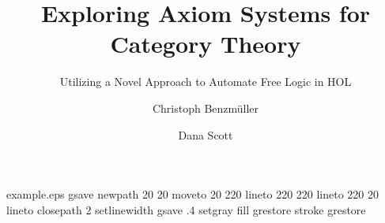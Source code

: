 %
%
%
%
%
\begin{filecontents*}{example.eps}
gsave
newpath
  20 20 moveto
  20 220 lineto
  220 220 lineto
  220 20 lineto
closepath
2 setlinewidth
gsave
  .4 setgray fill
grestore
stroke
grestore
\end{filecontents*}
%
\RequirePackage{fix-cm}
%
\documentclass[smallextended]{svjour3}       %
%
\smartqed  %
%
\usepackage{graphicx}
%
%
%
%
%


\title{Exploring Axiom Systems for Category Theory%
}
\subtitle{Utilizing a 
 Novel Approach to Automate Free Logic in HOL}


\author{Christoph Benzm\"uller       \and
      Dana Scott 
}




